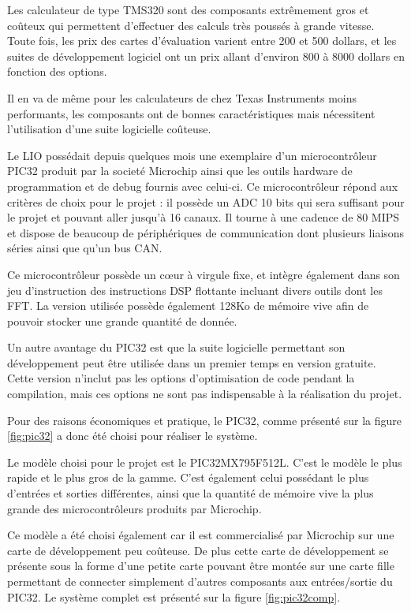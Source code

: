 \documentclass[letterpaper, twoside, 12pt, memoire, creativecommons, hyperref]{thETS}
\begin{document}
Les calculateur de type TMS320 sont des composants extrêmement gros et coûteux qui permettent d'effectuer des calculs très poussés à grande vitesse.  Toute fois, les prix des cartes d'évaluation varient entre 200 et 500 dollars, et les suites de développement logiciel ont un prix allant d'environ 800 à 8000 dollars en fonction des options. 

Il en va de même pour les calculateurs de chez Texas Instruments moins performants, les composants ont de bonnes caractéristiques mais nécessitent l'utilisation d'une suite logicielle coûteuse. 

Le LIO possédait depuis quelques mois une exemplaire d'un microcontrôleur PIC32 produit par la societé Microchip ainsi que les outils hardware de programmation et de debug fournis avec celui-ci. Ce microcontrôleur répond aux critères de choix pour le projet : il possède un ADC 10 bits qui sera suffisant pour le projet et pouvant aller jusqu’à 16 canaux. Il tourne à une cadence de 80 MIPS et dispose de beaucoup de périphériques de communication dont plusieurs liaisons séries ainsi que qu’un bus CAN. 

Ce microcontrôleur possède un cœur à virgule fixe, et intègre également dans son jeu d'instruction des instructions DSP flottante incluant divers outils dont les FFT. La version utilisée possède également 128Ko de mémoire vive afin de pouvoir stocker une grande quantité de donnée.

Un autre avantage du PIC32 est que la suite logicielle permettant son développement peut être utilisée dans un premier temps en version gratuite. Cette version n'inclut pas les options d'optimisation de code pendant la compilation, mais ces options ne sont pas indispensable à la réalisation du projet. 

Pour des raisons économiques et pratique, le PIC32, comme présenté sur la figure \ref{fig:pic32} %
 a donc été choisi pour réaliser le système.
 
Le modèle choisi pour le projet est le PIC32MX795F512L. C'est le modèle le plus rapide et le plus gros de la gamme. C'est également celui possédant le plus d'entrées et sorties différentes, ainsi que la quantité de mémoire vive la plus grande des microcontrôleurs produits par Microchip.

Ce modèle a été choisi également car il est commercialisé par Microchip sur une carte de développement peu coûteuse. De plus cette carte de développement se présente sous la forme d'une petite carte pouvant être montée sur une carte fille permettant de connecter simplement d'autres composants aux entrées/sortie du PIC32. Le système complet est présenté sur la figure \ref{fig:pic32comp}.
\end{document}
